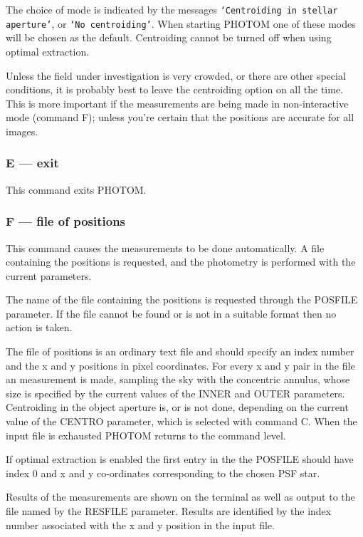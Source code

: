 \documentclass[twoside,11pt,nolof]{starlink}
\providecommand{\st}[1]{\texttt{`#1'}}
\begin{document}
The choice of mode is indicated by the messages \st{Centroiding in stellar
aperture}, or \st{No centroiding}. When starting PHOTOM one of these modes
will be chosen as the default. Centroiding cannot be turned off when using optimal extraction.

Unless the field under investigation is very crowded, or there are other
special conditions, it is probably best to leave the centroiding option
on all the time. This is more important if the measurements are being
made in non-interactive mode (command F); unless you're certain
that the positions are accurate for all images.

\subsubsection{E --- exit}

This command exits PHOTOM.

\subsubsection{F --- file of positions}

This command causes the measurements to be done automatically. A file
containing the positions is requested, and the photometry is performed
with the current parameters.

The name of the file containing the positions is requested through the
POSFILE parameter. If the file cannot be found or is not in a suitable
format then no action is taken.

The file of positions is an ordinary text file and should specify an
index number and the x and y positions in pixel coordinates. For every
x and y pair in the file an measurement is made, sampling the
sky with the concentric annulus, whose size is specified by the
current values of the INNER and OUTER parameters. Centroiding in the
object aperture is, or is not done, depending on the current value of
the CENTRO parameter, which is selected with command C. When the input
file is exhausted PHOTOM returns to the command level.

If optimal extraction is enabled the first entry in the the POSFILE
should have index 0 and x and y co-ordinates corresponding to
the chosen PSF star.

Results of the measurements are shown on the terminal as well as output
to the file named by the RESFILE parameter. Results are identified by
the index number associated with the x and y position in the input file.
\end{document}

